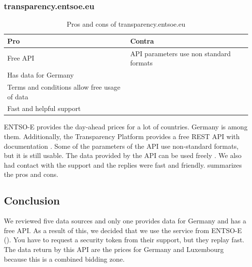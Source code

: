 \FloatBarrier
\subsubsection{transparency.entsoe.eu}\label{subsubsec:entsoe}
\begin{table}[htbp]
	\centering
	\begin{tabularx}{\textwidth}{ LLL }
		\toprule
		Pro & Contra \\\midrule
		 \tabitem Free API \cite{ENTSO} &\tabitem API parameters use non standard formats\\
		 \tabitem Has data for Germany &  \\
		 \tabitem Terms and conditions allow free usage of data \cite{ENTSO2} & \\
		 \tabitem Fast and helpful support \cite{ENTSO2} & \\
		\bottomrule
	\end{tabularx}
	\caption{Pros and cons of transparency.entsoe.eu}
	\label{tab:entsoe}
\end{table}
\noindent ENTSO-E provides the day-ahead prices for a lot of countries. Germany is among them. Additionally, the Transparency Platform provides a free REST API with documentation \cite{ENTSO}. Some of the parameters of the API use non-standard formats, but it is still usable. The data provided by the API can be used freely \cite{ENTSO2}. We also had contact with the support and the replies were fast and friendly.   summarizes the pros and cons.

\subsection{Conclusion}

We reviewed five data sources and only one provides data for Germany and has a free API. As a result of this, we decided that we use the service from ENTSO-E (). You have to request a security token from their support, but they replay fast. The data return by this API are the prices for Germany and Luxembourg because this is a combined bidding zone.

